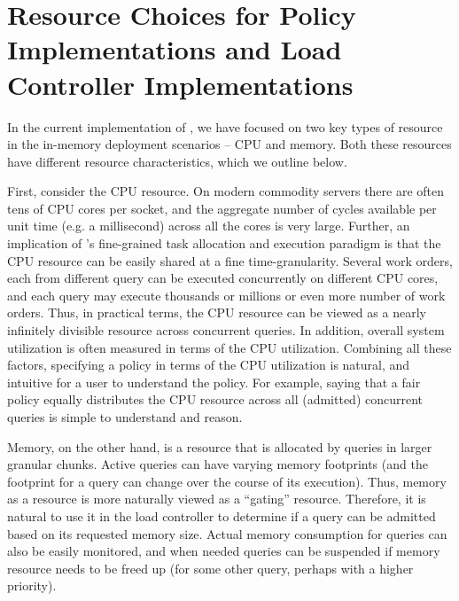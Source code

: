 \section{Resource Choices for Policy Implementations and Load Controller Implementations}\label{apx:resource-discussion}
In the current implementation of \sys{}, we have focused on two key types of resource in the in-memory deployment scenarios -- CPU and memory. 
Both these resources have different resource characteristics, which we outline below.

First, consider the CPU resource. 
On modern commodity servers there are often tens of CPU cores per socket, and the aggregate number of cycles available per unit time (e.g. a millisecond) across all the cores is very large. 
Further, an implication of \sys{}'s fine-grained task allocation and execution paradigm is that the CPU resource can be easily shared at a fine time-granularity. 
Several work orders, each from different query can be executed concurrently on different CPU cores, and each query may execute thousands or millions or even more number of work orders. 
Thus, in practical terms, the CPU resource can be viewed as a nearly infinitely divisible resource across concurrent queries. 
In addition, overall system utilization is often measured in terms of the CPU utilization. Combining all these factors, specifying a policy  in terms of the CPU utilization is natural, and intuitive for a user to understand the policy. 
For example, saying that a fair policy equally distributes the CPU resource across all (admitted) concurrent queries is simple to understand and reason. 

Memory, on the other hand, is a resource that is allocated by queries in larger granular chunks. 
Active queries can have varying memory footprints (and the footprint for a query can change over the course of its execution). 
Thus, memory as a resource is more naturally viewed as a ``gating'' resource. 
Therefore, it is natural to use it in the load controller to determine if a query can be admitted based on its requested memory size. 
Actual memory consumption for queries can also be easily monitored, and when needed queries can be suspended if memory resource needs to be freed up (for some other query, perhaps with a higher priority). 

